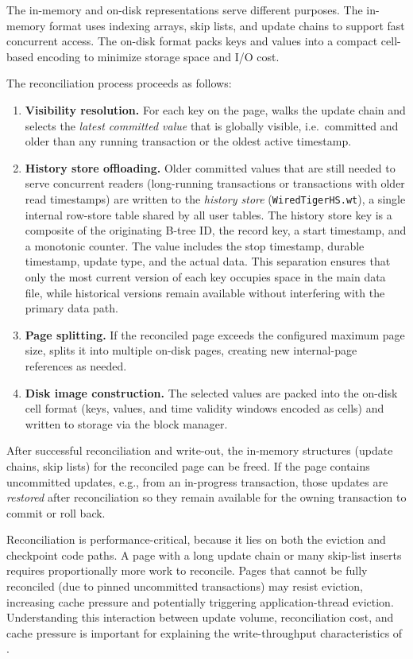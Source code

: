 The in-memory and on-disk representations serve different purposes.
The in-memory format uses indexing arrays, skip lists, and update chains to support fast concurrent access.
The on-disk format packs keys and values into a compact cell-based encoding to minimize storage space and I/O cost.

The reconciliation process proceeds as follows:

\begin{enumerate}
  \item \textbf{Visibility resolution.}  For each key on the page, \wt{}
    walks the update chain and selects the \emph{latest committed value} that
    is globally visible, i.e.\ committed and older than any running
    transaction or the oldest active timestamp.

  \item \textbf{History store offloading.}  Older committed values that are
    still needed to serve concurrent readers (long-running transactions or
    transactions with older read timestamps) are written to the
    \emph{history store} (\texttt{WiredTigerHS.wt}), a single internal
    row-store table shared by all user tables.  The history store key is a
    composite of the originating B-tree ID, the record key, a start timestamp,
    and a monotonic counter.  The value includes the stop timestamp, durable
    timestamp, update type, and the actual data.  This separation ensures that
    only the most current version of each key occupies space in the main data
    file, while historical versions remain available without interfering with
    the primary data path.

  \item \textbf{Page splitting.}  If the reconciled page exceeds the
    configured maximum page size, \wt{} splits it into multiple on-disk
    pages, creating new internal-page references as needed.

  \item \textbf{Disk image construction.}  The selected values are packed into
    the on-disk cell format (keys, values, and time validity windows encoded as
    cells) and written to storage via the block manager.
\end{enumerate}

After successful reconciliation and write-out, the in-memory structures (update chains, skip lists) for the reconciled page can be freed.
If the page contains uncommitted updates, e.g., from an in-progress transaction, those updates are \emph{restored} after reconciliation so they remain available for the owning transaction to commit or roll back.

Reconciliation is performance-critical, because it lies on both the eviction and checkpoint code paths.
A page with a long update chain or many skip-list inserts requires proportionally more work to reconcile.
Pages that cannot be fully reconciled (due to pinned uncommitted transactions) may resist eviction, increasing cache pressure and potentially triggering application-thread eviction.
Understanding this interaction between update volume, reconciliation cost, and cache pressure is important for explaining the write-throughput characteristics of \project{}.
